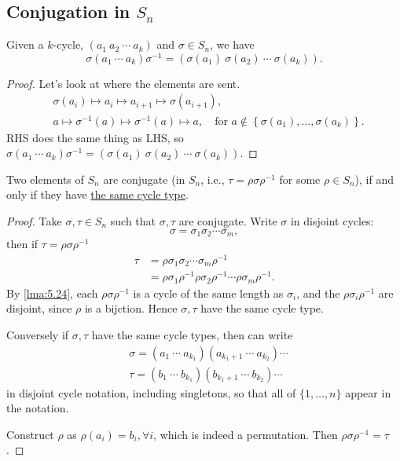 \documentclass[10pt]{article}
\begin{document}
      \subsection{Conjugation in $S_n$}
      \begin{lemma}\label{lma:5.24}
            Given a $k$-cycle, $(a_1\ a_2\ \cdots\ a_k)$ and $ \sigma\in S_n $, we have 
            \[
                \sigma(a_1\ \cdots \ a_k)\sigma^{-1}=(\sigma(a_1)\ \sigma(a_2)\ \cdots\ \sigma(a_k))
            .\]
      \end{lemma}
      \begin{proof}
          Let's look at where the elements are sent.
          \[
             \begin{aligned}
                  &\sigma(a_i) \mapsto a_i \mapsto a_{i+1} \mapsto \sigma(a_{i+1}),\\
                  &a \mapsto \sigma^{-1}(a) \mapsto \sigma^{-1}(a) \mapsto a,\quad \text{for $a\notin \left\{ \sigma(a_1),\dots, \sigma(a_k) \right\}$.}
             \end{aligned}
          \]
          RHS does the same thing as LHS, so $ \sigma(a_1\ \cdots \ a_k)\sigma^{-1}=(\sigma(a_1)\ \sigma(a_2)\ \cdots\ \sigma(a_k)) $.
      \end{proof}
      \begin{proposition}\label{prop:5.25}
          Two elements of $S_n$ are conjugate (in $S_n$, i.e., $\tau=\rho\sigma\rho^{-1}$ for some $\rho \in S_n$), if and only if they have \underline{the same cycle type}.
      \end{proposition}
      \begin{proof}
          Take $ \sigma, \tau\in S_n $ such that $ \sigma, \tau $ are conjugate. Write $ \sigma $ in disjoint cycles:
          \[
              \sigma=\sigma_1\sigma_2\cdots \sigma_m
          ,\]
          then if $ \tau=\rho\sigma\rho^{-1} $
          \[
            \begin{aligned}
                \tau&=\rho\sigma_1\sigma_2\cdots \sigma_m\rho^{-1}\\
                &= \rho\sigma_1\rho^{-1}\rho\sigma_2\rho^{-1}\cdots \rho\sigma_m\rho^{-1}.
            \end{aligned}
          \]
          By \ref{lma:5.24}, each $ \rho\sigma\rho^{-1} $ is a cycle of the same length as $\sigma_i$, and the $ \rho\sigma_i\rho^{-1} $ are disjoint, since $\rho$ is a bijction. Hence $ \sigma,\tau $ have the same cycle type.

          Conversely if $\sigma,\tau$ have the same cycle types, then can write 
          \[
            \begin{aligned}
                &\sigma= (a_1\ \cdots\ a_{k_1})(a_{k_1+1}\ \cdots\ a_{k_2})\cdots\\
                &\tau = (b_1\ \cdots\ b_{k_1})(b_{k_1+1}\ \cdots\ b_{k_2})\cdots
            \end{aligned}
          \]
          in disjoint cycle notation, including singletons, so that all of $\{1,\dots,n\}$ appear in the notation.

          Construct $ \rho $ as $ \rho(a_i)=b_i, \forall i$, which is indeed a permutation. Then $ \rho\sigma\rho^{-1}=\tau $.
      \end{proof}
\end{document}

